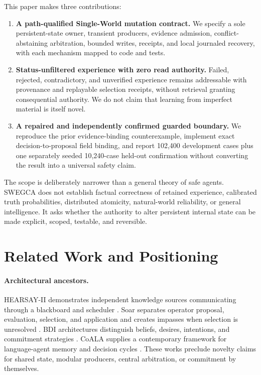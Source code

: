 \documentclass[10pt]{article}
\newcommand{\swegca}{\textsc{SWEGCA}}
\begin{document}
This paper makes three contributions:
\begin{enumerate}[leftmargin=*,itemsep=2pt]
  \item \textbf{A path-qualified Single-World mutation contract.} We specify a sole persistent-state owner, transient producers, evidence admission, conflict-abstaining arbitration, bounded writes, receipts, and local journaled recovery, with each mechanism mapped to code and tests.
  \item \textbf{Status-unfiltered experience with zero read authority.} Failed, rejected, contradictory, and unverified experience remains addressable with provenance and replayable selection receipts, without retrieval granting consequential authority. We do not claim that learning from imperfect material is itself novel.
  \item \textbf{A repaired and independently confirmed guarded boundary.} We reproduce the prior evidence-binding counterexample, implement exact decision-to-proposal field binding, and report 102,400 development cases plus one separately seeded 10,240-case held-out confirmation without converting the result into a universal safety claim.
\end{enumerate}

The scope is deliberately narrower than a general theory of safe agents. \swegca{} does not establish factual correctness of retained experience, calibrated truth probabilities, distributed atomicity, natural-world reliability, or general intelligence. It asks whether the authority to alter persistent internal state can be made explicit, scoped, testable, and reversible.

\section{Related Work and Positioning}

\paragraph{Architectural ancestors.}
HEARSAY-II demonstrates independent knowledge sources communicating through a blackboard and scheduler \cite{erman1980hearsay}. Soar separates operator proposal, evaluation, selection, and application and creates impasses when selection is unresolved \cite{laird2022soar}. BDI architectures distinguish beliefs, desires, intentions, and commitment strategies \cite{rao1995bdi}. CoALA supplies a contemporary framework for language-agent memory and decision cycles \cite{sumers2024coala}. These works preclude novelty claims for shared state, modular producers, central arbitration, or commitment by themselves.
\end{document}
